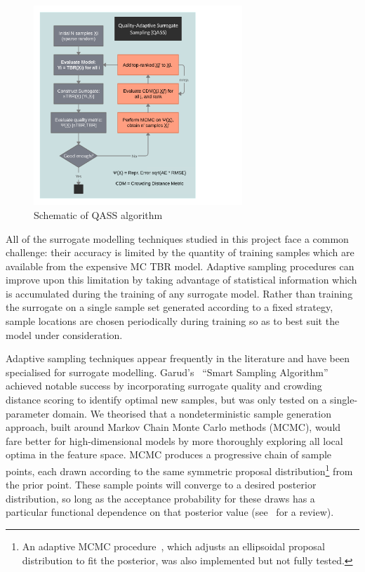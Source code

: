\begin{figure}
	\centering
	\vspace{-3ex}
	\includegraphics[width=0.7\textwidth]{fig4_qassplan.png}
	\caption{Schematic of QASS algorithm}
	\label{fig:qassplan}
\end{figure}

All of the surrogate modelling techniques studied in this project face a common
challenge: their accuracy is limited by the quantity of training samples which
are available from the expensive MC TBR model. Adaptive sampling procedures can
improve upon this limitation by taking advantage of statistical information
which is accumulated during the training of any surrogate model. Rather than
training the surrogate on a single sample set generated according to a fixed
strategy, sample locations are chosen periodically during training so as to best suit the model
under consideration.

Adaptive sampling techniques appear frequently in the literature and have been
specialised for surrogate modelling. Garud's~\cite{Garud2016} ``Smart Sampling
Algorithm'' achieved notable success by incorporating surrogate quality and
crowding distance scoring to identify optimal new samples, but was only tested
on a single-parameter domain. We theorised that a nondeterministic sample
generation approach, built around Markov Chain Monte Carlo methods (MCMC), would
fare better for high-dimensional models by more thoroughly exploring all local
optima in the feature space. MCMC produces a progressive chain of sample points,
each drawn according to the same symmetric proposal distribution\footnote{An
adaptive MCMC procedure~\cite{Zhang2012}, which adjusts an ellipsoidal proposal
distribution to fit the posterior, was also implemented but not fully tested.}
from the prior point. These sample points will converge to a desired posterior
distribution, so long as the acceptance probability for these draws has a
particular functional dependence on that posterior value (see~\cite{Zhou2018}
for a review).


